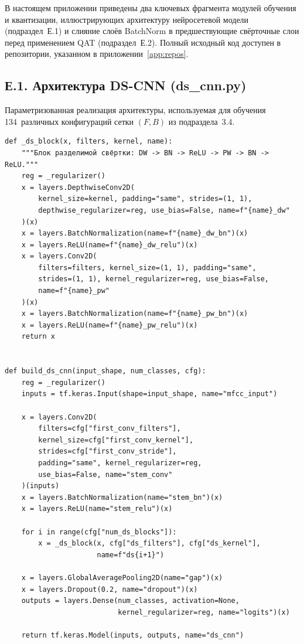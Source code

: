 \label{app:python_code}

В настоящем приложении приведены два ключевых фрагмента
модулей обучения и квантизации, иллюстрирующих архитектуру
нейросетевой модели (подраздел~Е.1) и слияние слоёв BatchNorm в
предшествующие свёрточные слои перед применением QAT
(подраздел~Е.2). Полный исходный код доступен в репозитории,
указанном в приложении~\ref{app:repos}.

\subsection*{Е.1. Архитектура DS-CNN (ds\_cnn.py)}

Параметризованная реализация архитектуры, используемая для
обучения 134~различных конфигураций сетки $(F, B)$ из
подраздела~3.4.

\begin{verbatim}
def _ds_block(x, filters, kernel, name):
    """Блок разделимой свёртки: DW -> BN -> ReLU -> PW -> BN -> ReLU."""
    reg = _regularizer()
    x = layers.DepthwiseConv2D(
        kernel_size=kernel, padding="same", strides=(1, 1),
        depthwise_regularizer=reg, use_bias=False, name=f"{name}_dw"
    )(x)
    x = layers.BatchNormalization(name=f"{name}_dw_bn")(x)
    x = layers.ReLU(name=f"{name}_dw_relu")(x)
    x = layers.Conv2D(
        filters=filters, kernel_size=(1, 1), padding="same",
        strides=(1, 1), kernel_regularizer=reg, use_bias=False,
        name=f"{name}_pw"
    )(x)
    x = layers.BatchNormalization(name=f"{name}_pw_bn")(x)
    x = layers.ReLU(name=f"{name}_pw_relu")(x)
    return x


def build_ds_cnn(input_shape, num_classes, cfg):
    reg = _regularizer()
    inputs = tf.keras.Input(shape=input_shape, name="mfcc_input")

    x = layers.Conv2D(
        filters=cfg["first_conv_filters"],
        kernel_size=cfg["first_conv_kernel"],
        strides=cfg["first_conv_stride"],
        padding="same", kernel_regularizer=reg,
        use_bias=False, name="stem_conv"
    )(inputs)
    x = layers.BatchNormalization(name="stem_bn")(x)
    x = layers.ReLU(name="stem_relu")(x)

    for i in range(cfg["num_ds_blocks"]):
        x = _ds_block(x, cfg["ds_filters"], cfg["ds_kernel"],
                      name=f"ds{i+1}")

    x = layers.GlobalAveragePooling2D(name="gap")(x)
    x = layers.Dropout(0.2, name="dropout")(x)
    outputs = layers.Dense(num_classes, activation=None,
                           kernel_regularizer=reg, name="logits")(x)

    return tf.keras.Model(inputs, outputs, name="ds_cnn")
\end{verbatim}

